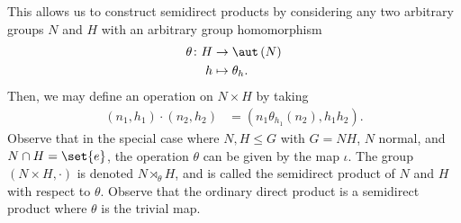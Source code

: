 \documentclass[10pt]{mypackage}
\begin{document}
This allows us to construct semidirect products by considering any two arbitrary groups $N$ and $H$ with an arbitrary group homomorphism
\begin{align*}
  \theta\colon H&\rightarrow \aut\left( N \right)\\
  h &\mapsto \theta_h.
\end{align*}
Then, we may define an operation on $N\times H$ by taking
\begin{align*}
  \left( n_1,h_1 \right)\cdot \left( n_2,h_2 \right) &= \left( n_1\theta_{h_1}\left(n_2\right), h_1h_2 \right).
\end{align*}
Observe that in the special case where $N,H\leq G$ with $G = NH$, $N$ normal, and $N\cap H = \set{e}$, the operation $\theta$ can be given by the map $\iota$. The group $\left( N\times H,\cdot \right)$ is denoted $N\rtimes_{\theta}H$, and is called the semidirect product of $N$ and $H$ with respect to $\theta$. Observe that the ordinary direct product is a semidirect product where $\theta$ is the trivial map.
\end{document}
